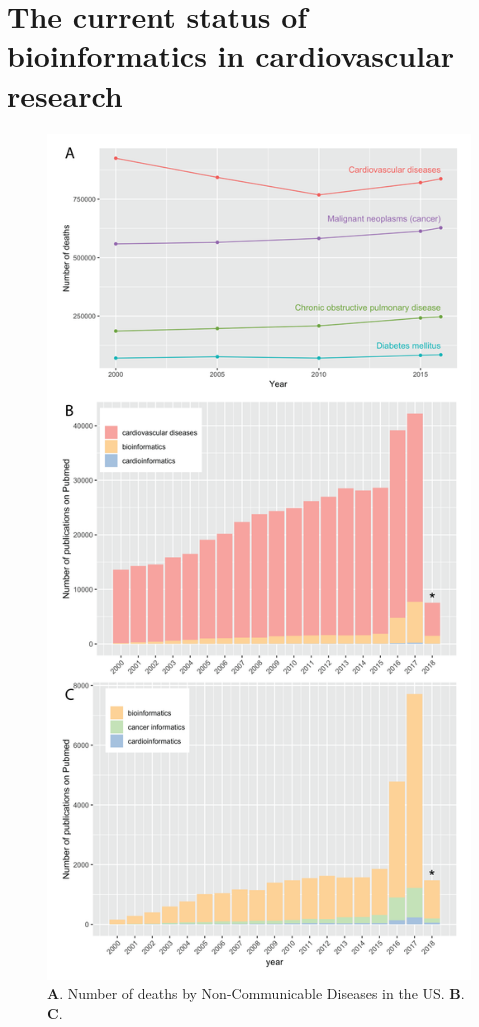 \documentclass[letter]{bioinfo}
\begin{document}
\section{The current status of bioinformatics in cardiovascular  research}
\begin{figure}
	\centering
	\includegraphics[width=1\linewidth]{figure1}
	\caption{\textbf{A}. Number of deaths by Non-Communicable Diseases in the US. \textbf{B}. \textbf{C}.}
	\label{fig:figure1}
\end{figure}
\end{document}

